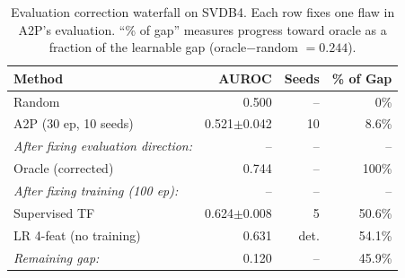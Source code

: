 \begin{table}[t]
\centering
\caption{Evaluation correction waterfall on SVDB4. Each row fixes one flaw in A2P's evaluation. ``\% of gap'' measures progress toward oracle as a fraction of the learnable gap (oracle$-$random $= 0.244$).}
\label{tab:waterfall}
\begin{tabular}{lrrr}
\toprule
\textbf{Method} & \textbf{AUROC} & \textbf{Seeds} & \textbf{\% of Gap} \\
\midrule
Random & 0.500 & -- & 0\% \\
A2P (30 ep, 10 seeds) & 0.521$\pm$0.042 & 10 & 8.6\% \\
\midrule
\textit{After fixing evaluation direction:} & -- & -- & -- \\
Oracle (corrected) & 0.744 & -- & 100\% \\
\textit{After fixing training (100 ep):} & -- & -- & -- \\
Supervised TF & 0.624$\pm$0.008 & 5 & 50.6\% \\
LR 4-feat (no training) & 0.631 & det. & 54.1\% \\
\midrule
\textit{Remaining gap:} & 0.120 & -- & 45.9\% \\
\bottomrule
\end{tabular}
\end{table}

